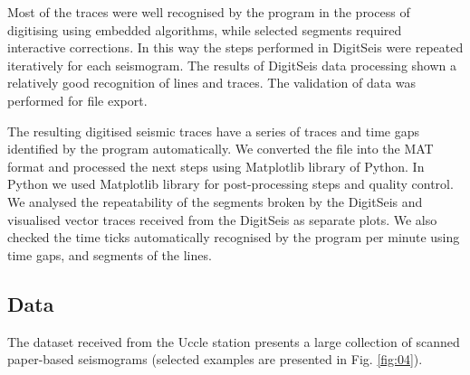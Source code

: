 \documentclass[sensors,article,submit,moreauthors,pdftex]{Definitions/mdpi}
\begin{document}
Most of the traces were well recognised by the program in the process of digitising using embedded algorithms, while selected segments required interactive corrections. In this way the steps performed in DigitSeis were repeated iteratively for each seismogram. The results of DigitSeis data processing shown a relatively good recognition of lines and traces. The validation of data was performed for file export.

The resulting digitised seismic traces have a series of traces and time gaps identified by the program automatically. We converted the file into the MAT format and processed the next steps using Matplotlib library of Python. In Python we used Matplotlib library for post-processing steps and quality control. We analysed the repeatability of the segments broken by the DigitSeis and visualised vector traces received from the DigitSeis as separate plots. We also checked the time ticks automatically recognised by the program per minute using time gaps, and segments of the lines. 

\subsection{Data}
The dataset received from the Uccle station presents a large collection of scanned paper-based seismograms (selected examples are presented in Fig. \ref{fig:04}). 
\end{document}
